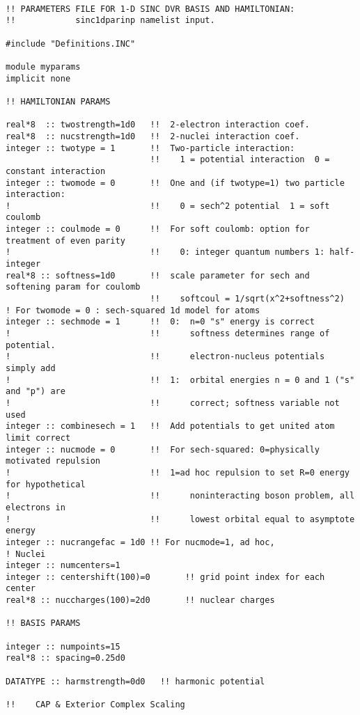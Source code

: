 \begin{verbatim}

!! PARAMETERS FILE FOR 1-D SINC DVR BASIS AND HAMILTONIAN:
!!            sinc1dparinp namelist input.

#include "Definitions.INC"

module myparams
implicit none

!! HAMILTONIAN PARAMS

real*8  :: twostrength=1d0   !!  2-electron interaction coef.
real*8  :: nucstrength=1d0   !!  2-nuclei interaction coef.
integer :: twotype = 1       !!  Two-particle interaction:
                             !!    1 = potential interaction  0 = constant interaction
integer :: twomode = 0       !!  One and (if twotype=1) two particle interaction:
!                            !!    0 = sech^2 potential  1 = soft coulomb
integer :: coulmode = 0      !!  For soft coulomb: option for treatment of even parity
!                            !!    0: integer quantum numbers 1: half-integer
real*8 :: softness=1d0       !!  scale parameter for sech and softening param for coulomb
                             !!    softcoul = 1/sqrt(x^2+softness^2)
! For twomode = 0 : sech-squared 1d model for atoms
integer :: sechmode = 1      !!  0:  n=0 "s" energy is correct
!                            !!      softness determines range of potential.
!                            !!      electron-nucleus potentials simply add
!                            !!  1:  orbital energies n = 0 and 1 ("s" and "p") are
!                            !!      correct; softness variable not used
integer :: combinesech = 1   !!  Add potentials to get united atom limit correct
integer :: nucmode = 0       !!  For sech-squared: 0=physically motivated repulsion
!                            !!  1=ad hoc repulsion to set R=0 energy for hypothetical
!                            !!      noninteracting boson problem, all electrons in
!                            !!      lowest orbital equal to asymptote energy
integer :: nucrangefac = 1d0 !! For nucmode=1, ad hoc, 
! Nuclei
integer :: numcenters=1
integer :: centershift(100)=0       !! grid point index for each center
real*8 :: nuccharges(100)=2d0       !! nuclear charges

!! BASIS PARAMS

integer :: numpoints=15
real*8 :: spacing=0.25d0

DATATYPE :: harmstrength=0d0   !! harmonic potential

!!    CAP & Exterior Complex Scaling


\end{verbatim}

